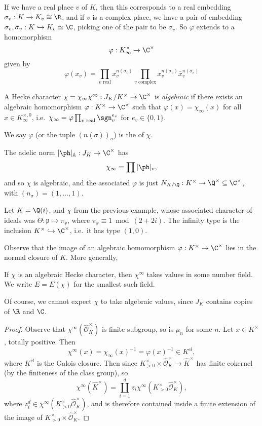 \documentclass[a4paper]{article}
\newcommand\A{\mathbb{A}}
\begin{document}
If we have a real place $v$ of $K$, then this corresponds to a real embedding $\sigma_v: K \to K_v \cong \R$, and if $v$ is a complex place, we have a pair of embedding $\sigma_v, \bar{\sigma}_v: K \hookrightarrow K_v \simeq \C$, picking one of the pair to be $\sigma_v$. So $\varphi$ extends to a homomorphism
\[
  \varphi: K_\infty^\times \to \C^\times
\]
given by
\[
  \varphi(x_v) = \prod_{v\text{ real}} x_v^{n(\sigma_v)} \prod_{v\text{ complex}} x_v^{n(\sigma_v)} \bar{x}_v^{n(\bar{\sigma}_v)}
\]
\begin{defi}
  A Hecke character $\chi = \chi_\infty \chi^\infty: J_K/K^\times \to \C^\times$ is \emph{algebraic} if there exists an algebraic homomorphism $\varphi: K^\times \to \C^\times$ such that $\varphi(x) = \chi_\infty(x)$ for all $x \in K_\infty^{\times, 0}$, i.e.\ $\chi_\infty = \varphi \prod_{v\text{ real}} \sgn_v^{e_v}$ for $e_v \in \{0, 1\}$.

  We say $\varphi$ (or the tuple $(n(\sigma))_\sigma$) is the  of $\chi$.
\end{defi}
\begin{eg}
  The adelic norm $|\ph|_{\A}: J_K \to \C^\times$ has
  \[
    \chi_\infty = \prod |\ph|_v,
  \]
  and so $\chi$ is algebraic, and the associated $\varphi$ is just $N_{K/\Q}: K^\times \to \Q^\times \subseteq \C^\times$, with $(n_\sigma) = (1, \ldots, 1)$.
\end{eg}

\begin{ex}
  Let $K = \Q(i)$, and $\chi$ from the previous example, whose associated character of ideals was $\Theta: \mathfrak{p} \mapsto \pi_\mathfrak{p}$, where $\pi_\mathfrak{p} \equiv 1 \bmod (2 + 2i)$. The infinity type is the inclusion $K^\times \hookrightarrow \C^\times$, i.e.\ it has type $(1, 0)$.
\end{ex}

Observe that the image of an algebraic homomorphism $\varphi: K^\times \to \C^\times$ lies in the normal closure of $K$. More generally,
\begin{prop}
  If $\chi$ is an algebraic Hecke character, then $\chi^\infty$ takes values in some number field. We write $E = E(\chi)$ for the smallest such field.
\end{prop}
Of course, we cannot expect $\chi$ to take algebraic values, since $J_K$ contains copies of $\R$ and $\C$.

\begin{proof}
  Observe that $\chi^\infty(\hat{\mathcal{O}}_K^\times)$ is finite subgroup, so is $\mu_n$ for some $n$. Let $x \in K^\times$, totally positive. Then
  \[
    \chi^\infty(x) = \chi_\infty(x)^{-1} = \varphi(x)^{-1} \in K^{cl},
  \]
  where $K^{cl}$ is the Galois closure. Then since $K_{>0}^\times \times \hat{\mathcal{O}}_K^\times \to \hat{K}^\times$ has finite cokernel (by the finiteness of the class group), so
  \[
    \chi^\infty(\hat{K}^\times) = \coprod_{i = 1}^d z_i \chi^\infty(K_{>0}^\times \hat{\mathcal{O}}_K^\times),
  \]
  where $z_i^d \in \chi^\infty(K_{>0}^\times \hat{\mathcal{O}}_K^\times)$, and is therefore contained inside a finite extension of the image of $K_{>0}^\times \times \hat{\mathcal{O}}_K^\times$.
\end{proof}
\end{document}
